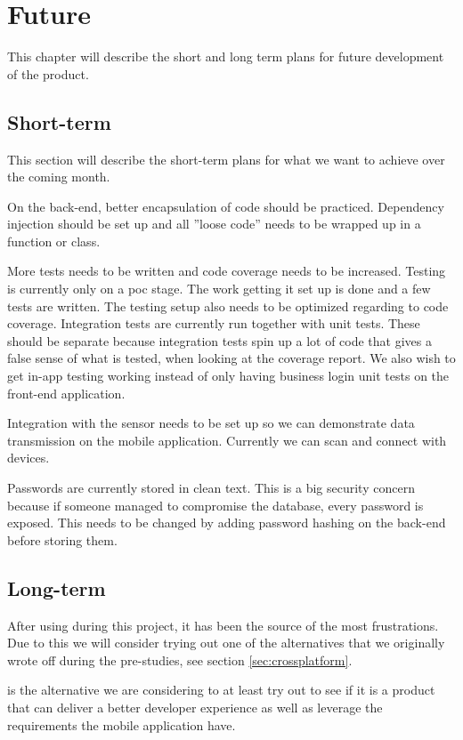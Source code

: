 \chapter{Future}
This chapter will describe the short and long term plans for future development of the product.

\section{Short-term}
This section will describe the short-term plans for what we want to achieve over the coming month.

On the back-end, better encapsulation of code should be practiced.
Dependency injection should be set up and all ''loose code'' needs to be wrapped up in a function or class.

More tests needs to be written and code coverage needs to be increased.
Testing is currently only on a \gls{poc} stage. The work getting it set up is done and a few tests are written.
The testing setup also needs to be optimized regarding to code coverage.
Integration tests are currently run together with unit tests. 
These should be separate because integration tests spin up a lot of code that gives a false sense of what is tested, when looking at the coverage report.
We also wish to get in-app testing working instead of only having business login unit tests on the front-end application.

Integration with the  sensor needs to be set up so we can demonstrate  data transmission on the mobile application.
Currently we can scan and connect with  devices.

Passwords are currently stored in clean text. 
This is a big security concern because if someone managed to compromise the database, every password is exposed. 
This needs to be changed by adding password hashing on the back-end before storing them.

\section{Long-term}
After using  during this project, it has been the source of the most frustrations.
Due to this we will consider trying out one of the alternatives that we originally wrote off during the pre-studies, see section \ref{sec:crossplatform}. 

 is the alternative we are considering to at least try out to see if it is a product that can deliver a better developer experience as well as leverage the requirements the mobile application have.

